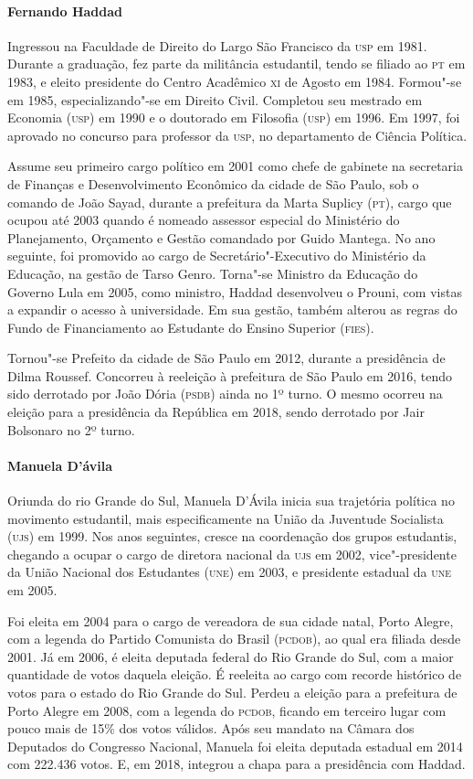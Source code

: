 \begin{bibliohedra}
\paragraph{Fernando Haddad} Ingressou na Faculdade de Direito do Largo São Francisco da \textsc{usp} em 1981.
Durante a graduação, fez parte da militância estudantil, tendo se
filiado ao \textsc{pt} em 1983, e eleito presidente do Centro Acadêmico \textsc{xi} de
Agosto em 1984. Formou"-se em 1985, especializando"-se em Direito Civil.
Completou seu mestrado em Economia (\textsc{usp}) em 1990 e o doutorado em
Filosofia (\textsc{usp}) em 1996. Em 1997, foi aprovado no concurso para
professor da \textsc{usp}, no departamento de Ciência Política.

Assume seu primeiro cargo político em 2001 como chefe de gabinete na
secretaria de Finanças e Desenvolvimento Econômico da cidade de São
Paulo, sob o comando de João Sayad, durante a prefeitura da Marta
Suplicy (\textsc{pt}), cargo que ocupou até 2003 quando é nomeado assessor
especial do Ministério do Planejamento, Orçamento e Gestão comandado por
Guido Mantega. No ano seguinte, foi promovido ao cargo de
Secretário"-Executivo do Ministério da Educação, na gestão de Tarso
Genro. Torna"-se Ministro da Educação do Governo Lula em 2005, como
ministro, Haddad desenvolveu o Prouni, com vistas a expandir o acesso à
universidade. Em sua gestão, também alterou as regras do Fundo de
Financiamento ao Estudante do Ensino Superior (\textsc{fies}).

Tornou"-se Prefeito da cidade de São Paulo em 2012, durante a presidência
de Dilma Roussef. Concorreu à reeleição à prefeitura de São Paulo em
2016, tendo sido derrotado por João Dória (\textsc{psdb}) ainda no 1º turno. O
mesmo ocorreu na eleição para a presidência da República em 2018, sendo
derrotado por Jair Bolsonaro no 2º turno.

\paragraph{Manuela D'ávila} Oriunda do rio Grande do Sul, Manuela D'Ávila inicia sua trajetória
política no movimento estudantil, mais especificamente na União da
Juventude Socialista (\textsc{ujs}) em 1999. Nos anos seguintes, cresce na
coordenação dos grupos estudantis, chegando a ocupar o cargo de diretora
nacional da \textsc{ujs} em 2002, vice"-presidente da União Nacional dos
Estudantes (\textsc{une}) em 2003, e presidente estadual da \textsc{une} em 2005.

Foi eleita em 2004 para o cargo de vereadora de sua cidade natal, Porto
Alegre, com a legenda do Partido Comunista do Brasil (\textsc{pcdob}), ao qual
era filiada desde 2001. Já em 2006, é eleita deputada federal do Rio
Grande do Sul, com a maior quantidade de votos daquela eleição. É
reeleita ao cargo com recorde histórico de votos para o estado do Rio
Grande do Sul. Perdeu a eleição para a prefeitura de Porto Alegre em
2008, com a legenda do \textsc{pcdob}, ficando em terceiro lugar com pouco mais
de 15\% dos votos válidos. Após seu mandato na Câmara dos Deputados do
Congresso Nacional, Manuela foi eleita deputada estadual em 2014 com
222.436 votos. E, em 2018, integrou a chapa para a presidência com
Haddad.


\end{bibliohedra}
